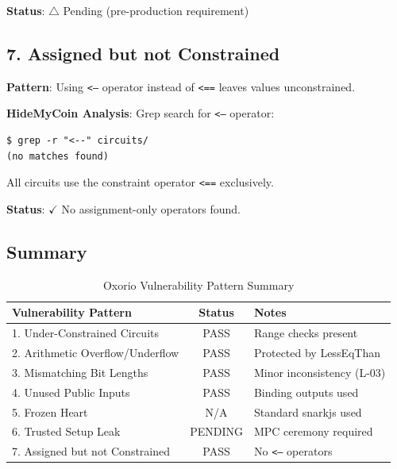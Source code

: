 \documentclass[11pt,a4paper]{article}
\begin{document}
\textbf{Status}: $\triangle$ Pending (pre-production requirement)

\subsection{7. Assigned but not Constrained}

\textbf{Pattern}: Using \texttt{<--} operator instead of \texttt{<==} leaves values unconstrained.

\textbf{HideMyCoin Analysis}: Grep search for \texttt{<--} operator:
\begin{verbatim}
$ grep -r "<--" circuits/
(no matches found)
\end{verbatim}

All circuits use the constraint operator \texttt{<==} exclusively.

\textbf{Status}: $\checkmark$ No assignment-only operators found.

\subsection{Summary}

\begin{table}[H]
\centering
\begin{tabular}{|l|c|l|}
\hline
\textbf{Vulnerability Pattern} & \textbf{Status} & \textbf{Notes} \\
\hline
1. Under-Constrained Circuits & \textcolor{green!50!black}{PASS} & Range checks present \\
2. Arithmetic Overflow/Underflow & \textcolor{green!50!black}{PASS} & Protected by LessEqThan \\
3. Mismatching Bit Lengths & \textcolor{green!50!black}{PASS} & Minor inconsistency (L-03) \\
4. Unused Public Inputs & \textcolor{green!50!black}{PASS} & Binding outputs used \\
5. Frozen Heart & \textcolor{green!50!black}{N/A} & Standard snarkjs used \\
6. Trusted Setup Leak & \textcolor{yellow!50!black}{PENDING} & MPC ceremony required \\
7. Assigned but not Constrained & \textcolor{green!50!black}{PASS} & No \texttt{<--} operators \\
\hline
\end{tabular}
\caption{Oxorio Vulnerability Pattern Summary}
\end{table}

\end{document}
